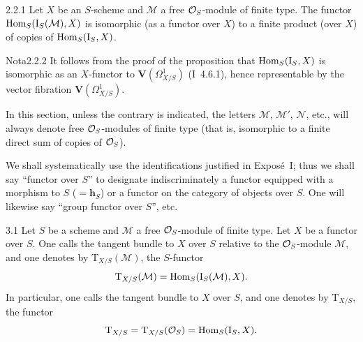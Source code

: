 \begin{corollary}{2.2.1}
\label{II.2.2.1}
Let \(X\) be an \(S\)-scheme and \(\mathcal{M}\) a free \(\mathcal{O}_S\)-module of finite
type.
The functor \(\operatorname{Hom}_S(\mathrm{I}_S(\mathcal{M}),X)\) is isomorphic (as a functor
over \(X\)) to a finite product (over \(X\)) of copies of
\(\operatorname{Hom}_S(\mathrm{I}_S,X)\).
\end{corollary}

\begin{enoncerm}{Nota}{2.2.2}
\label{II.2.2.2}
It follows from the proof of the proposition that
\(\operatorname{Hom}_S(\mathrm{I}_S,X)\) is isomorphic as an \(X\)-functor to
\(\mathbf{V}(\Omega^1_{X/S})\) (I~4.6.1), hence representable by the vector
fibration%
{\renewcommand{\thefootnote}{(12)}}
\(\mathbf{V}(\Omega^1_{X/S})\).
\end{enoncerm}

\label{II.sec.3}

In this section, unless the contrary is indicated, the letters \(\mathcal{M}\),
\(\mathcal{M}'\), \(\mathcal{N}\), etc., will always denote free
\(\mathcal{O}_S\)-modules of finite type (that is, isomorphic to a finite direct sum of
copies of \(\mathcal{O}_S\)).

We shall systematically use the identifications justified in Expos\'e~I; thus
we shall say ``functor over \(S\)'' to designate indiscriminately a functor
equipped with a morphism to \(S\) (\(=\mathbf{h}_S\)) or a functor on the
category of objects over \(S\). One will likewise say ``group functor over
\(S\)'', etc.

\begin{definition}{3.1}
\label{II.3.1}
Let \(S\) be a scheme and \(\mathcal{M}\) a free \(\mathcal{O}_S\)-module of finite
type. Let \(X\) be a functor over \(S\). One calls the tangent bundle to \(X\)
over \(S\) relative to the \(\mathcal{O}_S\)-module \(\mathcal{M}\), and one denotes by
\(\mathrm{T}_{X/S}(\mathcal{M})\), the \(S\)-functor
\[
\mathrm{T}_{X/S}(\mathcal{M})=\operatorname{Hom}_S(\mathrm{I}_S(\mathcal{M}),X).
\]
In particular, one calls the tangent bundle to \(X\) over \(S\), and one
denotes by \(\mathrm{T}_{X/S}\), the functor
\[
\mathrm{T}_{X/S}=\mathrm{T}_{X/S}(\mathcal{O}_S)=\operatorname{Hom}_S(\mathrm{I}_S,X).
\]%
{\renewcommand{\thefootnote}{(13)}}
\end{definition}

